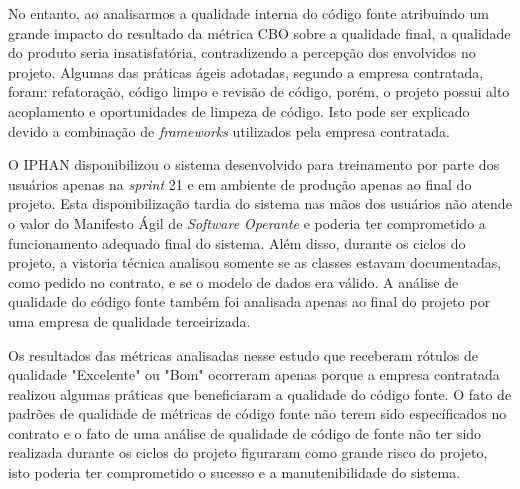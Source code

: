 No entanto, ao analisarmos a qualidade interna do código fonte atribuindo um grande impacto do resultado da métrica CBO sobre a qualidade final, a qualidade do produto seria insatisfatória, contradizendo a percepção dos envolvidos no projeto. Algumas das práticas ágeis adotadas, segundo a empresa contratada, foram: refatoração, código limpo e revisão de código, porém, o projeto possui alto acoplamento e oportunidades de limpeza de código. Isto pode ser explicado devido a combinação de \textit{frameworks} utilizados pela empresa contratada. 

O IPHAN disponibilizou o sistema desenvolvido para treinamento por parte dos usuários apenas na \textit{sprint} 21 e em ambiente de produção apenas ao final do projeto. Esta disponibilização tardia do sistema nas mãos dos usuários não atende o valor do Manifesto Ágil de \textit{Software Operante} e poderia ter comprometido a funcionamento adequado final do sistema. Além disso, durante os ciclos do projeto, a vistoria técnica analisou somente se as classes estavam documentadas, como pedido no contrato, e se o modelo de dados era válido. A análise de qualidade do código fonte também foi analisada apenas ao final do projeto por uma empresa de qualidade terceirizada. 

Os resultados das métricas analisadas nesse estudo que receberam rótulos de qualidade "Excelente" ou "Bom" ocorreram apenas porque a empresa contratada realizou algumas práticas que beneficiaram a qualidade do código fonte. O fato de padrões de qualidade de métricas de código fonte não terem sido específicados no contrato e o fato de uma análise de qualidade de código de fonte não ter sido realizada durante os ciclos do projeto figuraram como grande risco do projeto, isto poderia ter comprometido o sucesso e a manutenibilidade do sistema.

